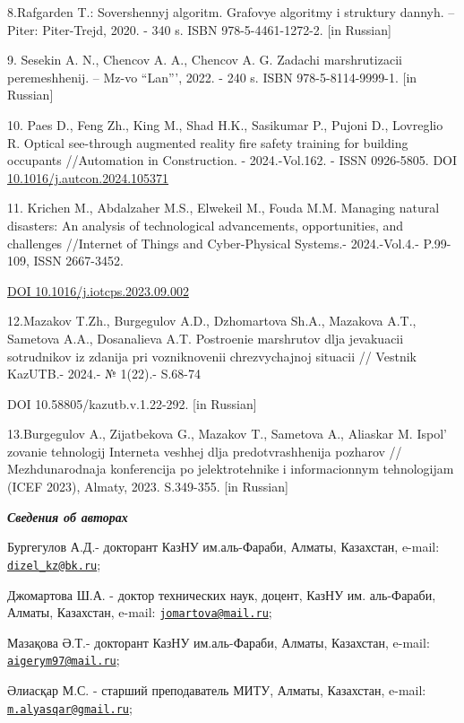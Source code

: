 8.Rafgarden T.: Sovershennyj algoritm. Grafovye algoritmy i struktury
dannyh. -- Piter: Piter-Trejd, 2020. - 340 s. ISBN 978-5-4461-1272-2.
{[}in Russian{]}

9. Sesekin A. N., Chencov A. A., Chencov A. G. Zadachi marshrutizacii
peremeshhenij. -- Mz-vo ``Lan''', 2022. - 240 s. ISBN
978-5-8114-9999-1. {[}in Russian{]}

10. Paes D., Feng Zh., King M., Shad H.K., Sasikumar P., Pujoni D.,
Lovreglio R. Optical see-through augmented reality fire safety training
for building occupants //Automation in Construction. - 2024.-Vol.162. -
ISSN 0926-5805. DOI
\href{https://doi.org/10.1016/j.autcon.2024.105371}{10.1016/j.autcon.2024.105371}

11. Krichen M., Abdalzaher M.S., Elwekeil M., Fouda M.M. Managing
natural disasters: An analysis of technological advancements,
opportunities, and challenges //Internet of Things and Cyber-Physical
Systems.- 2024.-Vol.4.- P.99-109, ISSN 2667-3452.

\href{https://doi.org/10.1016/j.iotcps.2023.09.002}{DOI
10.1016/j.iotcps.2023.09.002}

12.Mazakov T.Zh., Burgegulov A.D., Dzhomartova Sh.A., Mazakova A.T.,
Sametova A.A., Dosanalieva A.T. Postroenie marshrutov dlja jevakuacii
sotrudnikov iz zdanija pri vozniknovenii chrezvychajnoj situacii //
Vestnik KazUTB.- 2024.- № 1(22).- S.68-74

DOI 10.58805/kazutb.v.1.22-292. {[}in Russian{]}

13.Burgegulov A., Zijatbekova G., Mazakov T., Sametova A., Aliaskar M.
Ispol' zovanie tehnologij Interneta veshhej dlja
predotvrashhenija pozharov // Mezhdunarodnaja konferencija po
jelektrotehnike i informacionnym tehnologijam (ICEF 2023), Almaty, 2023.
S.349-355. {[}in Russian{]}

\emph{{\bfseries Сведения об авторах}}

Бургегулов А.Д.- докторант КазНУ им.аль-Фараби, Алматы, Казахстан,
e-mail: \href{mailto:dizel_kz@bk.ru}{\nolinkurl{dizel\_kz@bk.ru}};

Джомартова Ш.А. - доктор технических наук, доцент, КазНУ им. аль-Фараби,
Алматы, Казахстан, e-mail:
\href{mailto:jomartova@mail.ru}{\nolinkurl{jomartova@mail.ru}};

Мазақова Ә.Т.- докторант КазНУ им.аль-Фараби, Алматы, Казахстан, e-mail:
\href{mailto:aigerym97@mail.ru}{\nolinkurl{aigerym97@mail.ru}};

Әлиасқар М.С. - старший преподаватель МИТУ, Алматы, Казахстан, e-mail:
\href{mailto:m.alyasqar@gmail.ru}{\nolinkurl{m.alyasqar@gmail.ru}};


